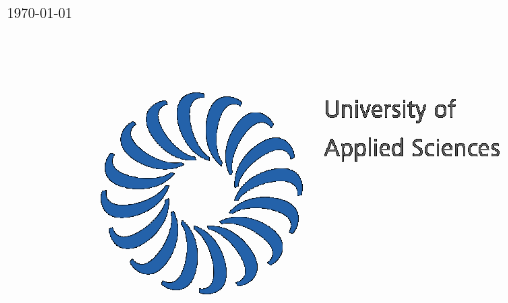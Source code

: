 \documentclass[12pt]{article}
\begin{document}
\begin{titlepage}


{\large \today}\\[2cm] %


\includegraphics{pic/logo.png}\\[1cm] %
 

\vfill %

\end{titlepage}

\tableofcontents

\listoffigures

\listoftables


\newpage


\begin{abstract}
	
\end{abstract}
\end{document}
